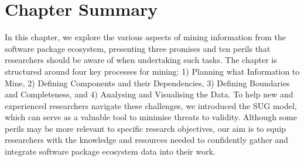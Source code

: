 \section{Chapter Summary}
In this chapter, we explore the various aspects of mining information from the software package ecosystem, presenting three promises and ten perils that researchers should be aware of when undertaking such tasks. The chapter is structured around four key processes for mining: 1) Planning what Information to Mine, 2) Defining Components and their Dependencies, 3) Defining Boundaries and Completeness, and 4) Analysing and Visualising the Data. To help new and experienced researchers navigate these challenges, we introduced the SUG model, which can serve as a valuable tool to minimise threats to validity. Although some perils may be more relevant to specific research objectives, our aim is to equip researchers with the knowledge and resources needed to confidently gather and integrate software package ecosystem data into their work.
